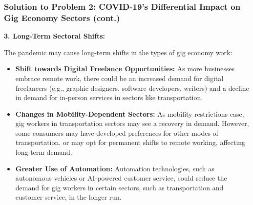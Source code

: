\documentclass{beamer}
\begin{document}
\begin{frame}
\frametitle{Solution to Problem 2: COVID-19’s Differential Impact on Gig Economy Sectors (cont.)}
\textbf{3. Long-Term Sectoral Shifts:}

The pandemic may cause long-term shifts in the types of gig economy work:
\begin{itemize}
    \item \textbf{Shift towards Digital Freelance Opportunities:} As more businesses embrace remote work, there could be an increased demand for digital freelancers (e.g., graphic designers, software developers, writers) and a decline in demand for in-person services in sectors like transportation.
    \item \textbf{Changes in Mobility-Dependent Sectors:} As mobility restrictions ease, gig workers in transportation sectors may see a recovery in demand. However, some consumers may have developed preferences for other modes of transportation, or may opt for permanent shifts to remote working, affecting long-term demand.
    \item \textbf{Greater Use of Automation:} Automation technologies, such as autonomous vehicles or AI-powered customer service, could reduce the demand for gig workers in certain sectors, such as transportation and customer service, in the longer run.
\end{itemize}
\end{frame}
\end{document}
